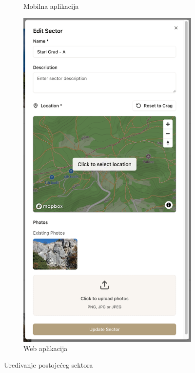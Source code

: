 \begin{figure}[H]
\begin{subfigure}[b]{0.38\textwidth}
        \caption{Mobilna aplikacija}
        \label{fig:uredjivanje_sektora_mob}
    \end{subfigure}
    \hfill
    \begin{subfigure}[b]{0.43\textwidth}
        \centering
        \includegraphics[width=\textwidth]{images/implementacija/web/editing-options/edit-sector.png}
        \caption{Web aplikacija}
        \label{fig:uredjivanje_sektora_web}
    \end{subfigure}
    \caption{Uređivanje postojećeg sektora}
    \label{fig:uredjivanje_sektora}
\end{figure}



